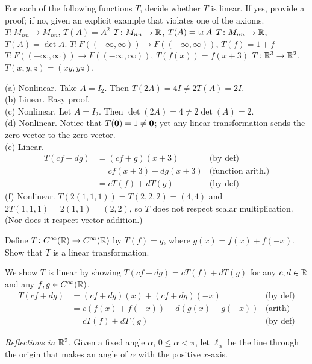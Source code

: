 \bb
\begin{samepage}
\ii For each of the following functions $T$, decide whether $T$ is linear. If yes, provide a proof; if no, given an explicit example that violates one of the axioms.  
\bb
\ii $T\colon M_{nn}\rightarrow M_{nn}$, $T(A)=A^2$ 
\ii $T\colon M_{nn}\rightarrow {\mathbb R}$, $T(A)=\operatorname{tr} A$
\ii $T\colon M_{nn}\rightarrow {\mathbb R}$, $T(A)=\det A$. 
\ii $T\colon F((-\infty, \infty))\rightarrow F((-\infty, \infty))$, $T(f)=1+f$
\ii $T\colon F((-\infty, \infty))\rightarrow F((-\infty, \infty))$, $T(f(x))=f(x+3)$
\ii $T\colon{\mathbb R}^3\rightarrow {\mathbb R}^2$, $T(x,y,z)=(xy,yz)$. 
\ee
\end{samepage}
\begin{solution}
\noindent
(a) Nonlinear. Take $A=I_2$. Then $T(2A)=4I\ne 2T(A)=2I$. 
\\
(b) Linear. Easy proof. 
\\
(c) Nonlinear. Let $A=I_2$. Then $\det(2A)=4\ne 2\det(A)=2$. 
\\
(d) Nonlinear. Notice that $T({\mathbf 0})=1\ne{\mathbf 0}$; yet any linear transformation sends the zero vector to the zero vector. 
\\
(e) Linear. 
\begin{align*}
T(cf+dg)&=(cf+g)(x+3)&\text{(by def)}\\
&=cf(x+3)+dg(x+3)&\text{(function arith.)}\\
&=cT(f)+dT(g) &\text{(by def)}
\end{align*}
(f) Nonlinear. $T(2(1,1,1))=T(2,2,2)=(4,4)$ and $2T(1,1,1)=2(1,1)=(2,2)$, so $T$ does not respect scalar multiplication. (Nor does it respect vector addition.) 
\end{solution}
\ii Define $T\colon C^\infty({\mathbb R})\rightarrow C^\infty({\mathbb R})$ by $T(f)=g$, where $g(x)=f(x)+f(-x)$. 
\\
Show that $T$ is a linear transformation.
\\
\begin{solution}
\noindent We show $T$ is linear by showing $T(cf+dg)=cT(f)+dT(g)$ for any $c,d\in{\mathbb R}$ and any $f,g\in C^\infty({\mathbb R})$. 
\begin{align*}
T(cf+dg)&=(cf+dg)(x)+(cf+dg)(-x) &\text{(by def)}\\
&=c(f(x)+f(-x))+d(g(x)+g(-x)) &\text{(arith)}\\
&=cT(f)+dT(g) &\text{(by def)}
\end{align*}
\end{solution}
\ii \label{ex:linereflection}{\em Reflections in ${\mathbb R}^2$}. Given a fixed angle $\alpha$, $0\leq \alpha<\pi $, let $\ell_{\alpha}$ be the line through the origin that makes an angle of $\alpha$ with the positive $x$-axis. 
